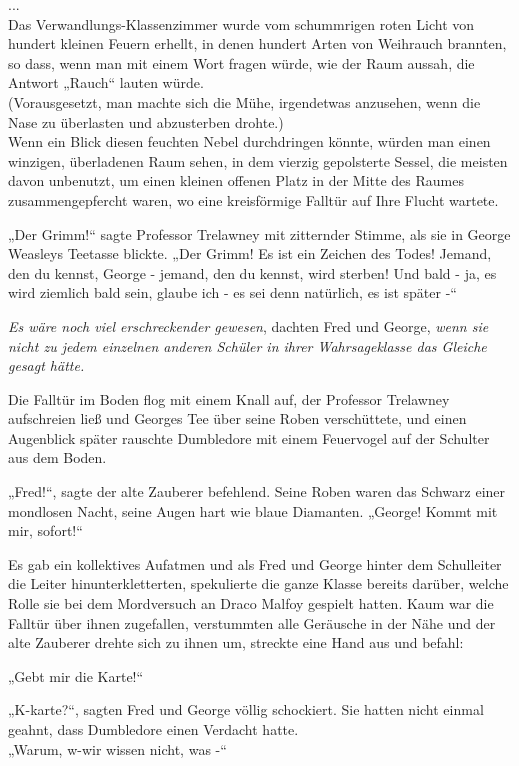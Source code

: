 {...\\ Das Verwandlungs-Klassenzimmer wurde vom schummrigen roten Licht von hundert kleinen Feuern erhellt, in denen hundert Arten von Weihrauch brannten, so dass, wenn man mit einem Wort fragen würde, wie der Raum aussah, die Antwort „Rauch“ lauten würde.\\ (Vorausgesetzt, man machte sich die Mühe, irgendetwas anzusehen, wenn die Nase zu überlasten und abzusterben drohte.)\\ Wenn ein Blick diesen feuchten Nebel durchdringen könnte, würden man einen winzigen, überladenen Raum sehen, in dem vierzig gepolsterte Sessel, die meisten davon unbenutzt, um einen kleinen offenen Platz in der Mitte des Raumes zusammengepfercht waren, wo eine kreisförmige Falltür auf Ihre Flucht wartete.

„Der Grimm!“ sagte Professor Trelawney mit zitternder Stimme, als sie in George Weasleys Teetasse blickte. „Der Grimm! Es ist ein Zeichen des Todes! Jemand, den du kennst, George - jemand, den du kennst, wird sterben! Und bald - ja, es wird ziemlich bald sein, glaube ich - es sei denn natürlich, es ist später -“

\emph{Es wäre noch viel erschreckender gewesen}, dachten Fred und George, \emph{wenn sie nicht zu jedem einzelnen anderen Schüler in ihrer Wahrsageklasse das Gleiche gesagt hätte.}

Die Falltür im Boden flog mit einem Knall auf, der Professor Trelawney aufschreien ließ und Georges Tee über seine Roben verschüttete, und einen Augenblick später rauschte Dumbledore mit einem Feuervogel auf der Schulter aus dem Boden.

„Fred!“, sagte der alte Zauberer befehlend. Seine Roben waren das Schwarz einer mondlosen Nacht, seine Augen hart wie blaue Diamanten. „George! Kommt mit mir, sofort!“

Es gab ein kollektives Aufatmen und als Fred und George hinter dem Schulleiter die Leiter hinunterkletterten, spekulierte die ganze Klasse bereits darüber, welche Rolle sie bei dem Mordversuch an Draco Malfoy gespielt hatten. Kaum war die Falltür über ihnen zugefallen, verstummten alle Geräusche in der Nähe und der alte Zauberer drehte sich zu ihnen um, streckte eine Hand aus und befahl:

„Gebt mir die Karte!“

„K-karte?“, sagten Fred und George völlig schockiert. Sie hatten nicht einmal geahnt, dass Dumbledore einen Verdacht hatte.\\ „Warum, w-wir wissen nicht, was -“

}
